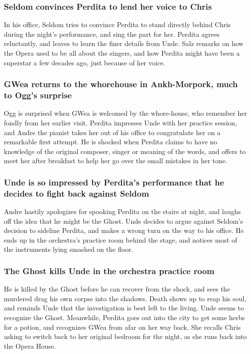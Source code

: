 \subsubsection{\Gls{Seldom} convinces \Gls{Perdita} to lend her voice to \Gls{Chris}}
In his office, \Gls{Seldom} tries to convince \Gls{Perdita} to stand directly behind \Gls{Chris}
during the night's performance, and sing the part for her. \Gls{Perdita} agrees reluctantly, and
leaves to learn the finer details from \Gls{Unde}. \Gls{Salz} remarks on how the Opera used to be
all about the singers, and how \Gls{Perdita} might have been a superstar a few decades ago, just
because of her voice.

\subsubsection{\Gls{GWea} returns to the whorehouse in Ankh-Morpork, much to \Gls{Ogg}'s surprise}
\Gls{Ogg} is surprised when \Gls{GWea} is welcomed by the whore-house, who remember her fondly from
her earlier visit. \Gls{Perdita} impresses \Gls{Unde} with her practice session, and \Gls{Andre} the
pianist takes her out of his office to congratulate her on a remarkable first attempt. He is shocked
when \Gls{Perdita} claims to have no knowledge of the original composer, singer or meaning of the
words, and offers to meet her after breakfast to help her go over the small mistakes in her tone.

\subsubsection{\Gls{Unde} is so impressed by \Gls{Perdita}'s performance that he decides to
    fight back against \Gls{Seldom}}
\Gls{Andre} hastily apologizes for spooking \Gls{Perdita} on the stairs at night, and laughs off the
idea that he might be the \Gls{Ghost}. \Gls{Unde} decides to argue against \Gls{Seldom}'s decision
to sideline \Gls{Perdita}, and makes a wrong turn on the way to his office. He ends up in the
orchestra's practice room behind the stage, and notices most of the instruments lying smashed on the
floor.

\subsubsection{The \Gls{Ghost} kills \Gls{Unde} in the orchestra practice room}
He is killed by the \Gls{Ghost} before he can recover from the shock, and sees the murdered drag his
own corpse into the shadows. \Gls{Death} shows up to reap his soul, and reminds \Gls{Unde} that the
investigation is best left to the living. \Gls{Unde} seems to recognize the \Gls{Ghost}. Meanwhile,
\Gls{Perdita} goes out into the city to get some herbs for a potion, and recognizes \Gls{GWea} from
afar on her way back. She recalls \Gls{Chris} asking to switch back to her original bedroom for the
night, as she runs back into the Opera House.

